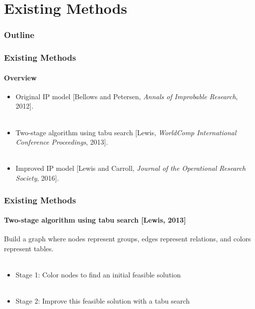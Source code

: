 \documentclass{beamer}
\newcommand{\AutoSectionTitle}{}
\begin{document}


\renewcommand{\AutoSectionTitle}{Existing Methods}

\section{\AutoSectionTitle}

\begin{frame}
  \frametitle{Outline}
  \tableofcontents[currentsection]
\end{frame}




\begin{frame}
  \frametitle{\AutoSectionTitle}
  \framesubtitle{Overview}
  
  \begin{itemize}
  \item Original IP model [Bellows and Petersen, \emph{Annals of Improbable Research}, 2012]. \\~\\
  \item Two-stage algorithm using tabu search [Lewis, \emph{WorldComp International Conference Proceedings}, 2013]. \\~\\
  \item Improved IP model [Lewis and Carroll, \emph{Journal of the Operational Research Society}, 2016].
  \end{itemize}
  
\end{frame}




\begin{frame}
  \frametitle{\AutoSectionTitle}
  \framesubtitle{Two-stage algorithm using tabu search [Lewis, 2013]}
  
  Build a graph where nodes represent groups, edges represent relations, and colors represent tables. \\~\\
  
  \begin{itemize}
  \item Stage 1: Color nodes to find an initial feasible solution \\~\\
  \item Stage 2: Improve this feasible solution with a tabu search
  \end{itemize}
  
\end{frame}
\end{document}
